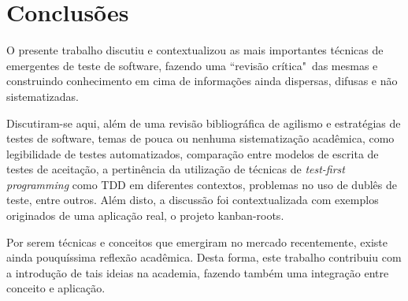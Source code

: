 \chapter{Conclusões} %
\label{cha:conclusoes}

O presente trabalho discutiu e contextualizou as mais importantes técnicas de emergentes de teste de software, fazendo uma ``revisão crítica"\ das mesmas e construindo conhecimento em cima de informações ainda dispersas, difusas e não sistematizadas.

Discutiram-se aqui, além de uma revisão bibliográfica de agilismo e estratégias de testes de software, temas de pouca ou nenhuma sistematização acadêmica, como legibilidade de testes automatizados, comparação entre modelos de escrita de testes de aceitação, a pertinência da utilização de técnicas de \textit{test-first programming} como TDD em diferentes contextos, problemas no uso de dublês de teste, entre outros. Além disto, a discussão foi contextualizada com exemplos originados de uma aplicação real, o projeto kanban-roots.

Por serem técnicas e conceitos que emergiram no mercado recentemente, existe ainda pouquíssima reflexão acadêmica. Desta forma, este trabalho contribuiu com a introdução de tais ideias na academia, fazendo também uma integração entre conceito e aplicação.

